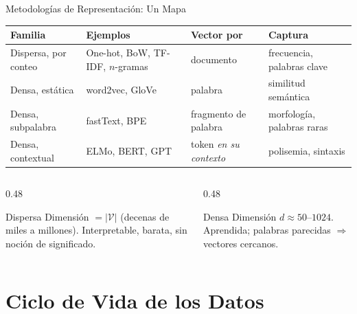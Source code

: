 \documentclass[aspectratio=169, 10pt]{beamer}
\newcommand{\V}{\mathcal{V}}
\begin{document}
\begin{frame}{Metodolog\'ias de Representaci\'on: Un Mapa}

	\begin{center}
		\footnotesize
		\begin{tabular}{@{}llll@{}}
			\toprule
			\textbf{Familia} & \textbf{Ejemplos} & \textbf{Vector por} & \textbf{Captura} \\
			\midrule
			Dispersa, por conteo & One-hot, BoW, TF-IDF, $n$-gramas & documento & frecuencia, palabras clave \\
			Densa, est\'atica & word2vec, GloVe & palabra & similitud sem\'antica \\
			Densa, subpalabra & fastText, BPE & fragmento de palabra & morfolog\'ia, palabras raras \\
			Densa, contextual & ELMo, BERT, GPT & token \emph{en su contexto} & polisemia, sintaxis \\
			\bottomrule
		\end{tabular}
	\end{center}

	\vspace{0.3cm}

	\begin{columns}[T]
		\begin{column}{0.48\textwidth}
			\begin{block}{Dispersa}
				\small
				Dimensi\'on $= |\V|$ (decenas de miles a millones). Interpretable, barata, sin noci\'on de significado.
			\end{block}
		\end{column}
		\begin{column}{0.48\textwidth}
			\begin{block}{Densa}
				\small
				Dimensi\'on $d \approx 50$--$1024$. Aprendida; palabras parecidas $\Rightarrow$ vectores cercanos.
			\end{block}
		\end{column}
	\end{columns}

\end{frame}

\section{Ciclo de Vida de los Datos}
\end{document}
